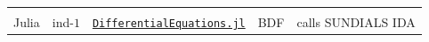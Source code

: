 \documentclass[]{book}
\theoremstyle{definition}
\theoremstyle{definition}
\theoremstyle{definition}
\theoremstyle{remark}
\begin{document}
\begin{longtable}[]{@{}lllll@{}}
\begin{minipage}[t]{0.40\columnwidth}
\end{minipage}\tabularnewline
\begin{minipage}[t]{0.05\columnwidth}\raggedright
Julia\strut
\end{minipage} & \begin{minipage}[t]{0.05\columnwidth}\raggedright
ind-\(1\)\strut
\end{minipage} & \begin{minipage}[t]{0.30\columnwidth}\raggedright
\href{https://docs.juliadiffeq.org/latest/index.html}{\texttt{DifferentialEquations.jl}}\strut
\end{minipage} & \begin{minipage}[t]{0.05\columnwidth}\raggedright
BDF\strut
\end{minipage} & \begin{minipage}[t]{0.40\columnwidth}\raggedright
calls SUNDIALS IDA\strut
\end{minipage}\tabularnewline
\bottomrule
\end{longtable}


\end{document}
